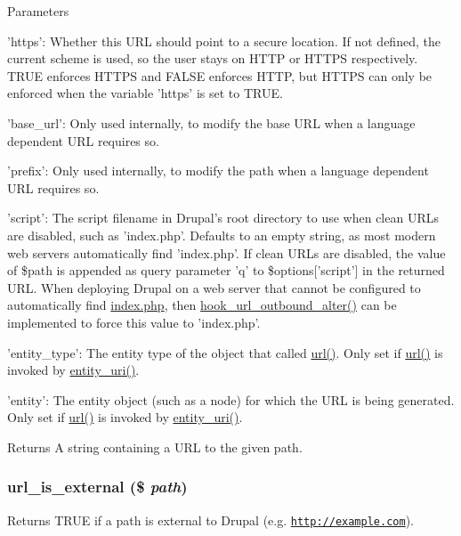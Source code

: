 \begin{DoxyParams}{Parameters}
\begin{DoxyItemize}
\item 'https': Whether this URL should point to a secure location. If not defined, the current scheme is used, so the user stays on HTTP or HTTPS respectively. TRUE enforces HTTPS and FALSE enforces HTTP, but HTTPS can only be enforced when the variable 'https' is set to TRUE.
\item 'base\_\-url': Only used internally, to modify the base URL when a language dependent URL requires so.
\item 'prefix': Only used internally, to modify the path when a language dependent URL requires so.
\item 'script': The script filename in Drupal's root directory to use when clean URLs are disabled, such as 'index.php'. Defaults to an empty string, as most modern web servers automatically find 'index.php'. If clean URLs are disabled, the value of \$path is appended as query parameter 'q' to \$options\mbox{[}'script'\mbox{]} in the returned URL. When deploying Drupal on a web server that cannot be configured to automatically find \hyperlink{index_8php}{index.php}, then \hyperlink{group__hooks_gaae456dc4459a029bc099079814ded61f}{hook\_\-url\_\-outbound\_\-alter()} can be implemented to force this value to 'index.php'.
\item 'entity\_\-type': The entity type of the object that called \hyperlink{common_8inc_a43b2a0594431556db49df980801d8807}{url()}. Only set if \hyperlink{common_8inc_a43b2a0594431556db49df980801d8807}{url()} is invoked by \hyperlink{common_8inc_a00f3b77a23f66be91c30ae42d8ea40cd}{entity\_\-uri()}.
\item 'entity': The entity object (such as a node) for which the URL is being generated. Only set if \hyperlink{common_8inc_a43b2a0594431556db49df980801d8807}{url()} is invoked by \hyperlink{common_8inc_a00f3b77a23f66be91c30ae42d8ea40cd}{entity\_\-uri()}.
\end{DoxyItemize}\end{DoxyParams}
\begin{DoxyReturn}{Returns}
A string containing a URL to the given path. 
\end{DoxyReturn}
\hypertarget{common_8inc_a64a2003ba42a719fc38a046a3507ad56}{
\subsubsection[{url\_\-is\_\-external}]{\setlength{\rightskip}{0pt plus 5cm}url\_\-is\_\-external (\$ {\em path})}}
\label{common_8inc_a64a2003ba42a719fc38a046a3507ad56}
Returns TRUE if a path is external to Drupal (e.g. \href{http://example.com}{\tt http://example.com}).

